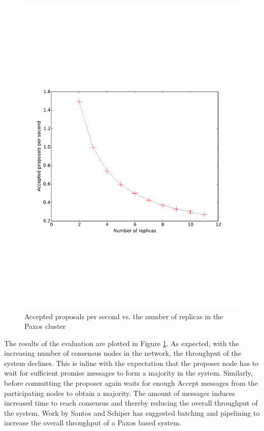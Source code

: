 \documentclass[conference]{IEEEtran}
\begin{document}
\begin{figure}[!h]
	\label{figure1}
	\centering
	\vspace*{-3cm}
	\includegraphics[scale=.45]{figure1}
	\vspace*{-3cm}
	\caption{Accepted proposals per second vs. the number of replicas in the Paxos cluster}
\end{figure}

The results of the evaluation are plotted in Figure \ref{figure1}. 
As expected, with the increasing number of consensus nodes in the network, the throughput of the system declines. 
This is inline with the expectation that the proposer node has to wait for sufficient promise messages to form a majority in the system. 
Similarly, before committing the proposer again waits for enough Accept messages from the participating nodes to obtain a majority. 
The amount of messages induces increased time to reach consensus and thereby reducing the overall throughput of the system. 
Work by Santos and Schiper \cite{b2} has suggested batching and pipelining to increase the overall throughput of a Paxos based system. 
\end{document}
